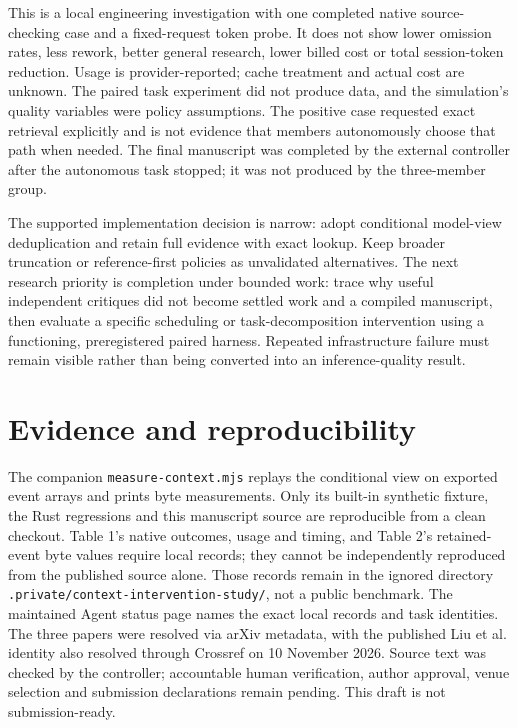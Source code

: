 \documentclass[11pt,a4paper]{article}
\begin{document}
This is a local engineering investigation with one completed native source-checking case and a fixed-request token probe. It does not show lower omission rates, less rework, better general research, lower billed cost or total session-token reduction. Usage is provider-reported; cache treatment and actual cost are unknown. The paired task experiment did not produce data, and the simulation's quality variables were policy assumptions. The positive case requested exact retrieval explicitly and is not evidence that members autonomously choose that path when needed. The final manuscript was completed by the external controller after the autonomous task stopped; it was not produced by the three-member group.

The supported implementation decision is narrow: adopt conditional model-view deduplication and retain full evidence with exact lookup. Keep broader truncation or reference-first policies as unvalidated alternatives. The next research priority is completion under bounded work: trace why useful independent critiques did not become settled work and a compiled manuscript, then evaluate a specific scheduling or task-decomposition intervention using a functioning, preregistered paired harness. Repeated infrastructure failure must remain visible rather than being converted into an inference-quality result.

\section*{Evidence and reproducibility}
The companion \texttt{measure-context.mjs} replays the conditional view on exported event arrays and prints byte measurements. Only its built-in synthetic fixture, the Rust regressions and this manuscript source are reproducible from a clean checkout. Table 1's native outcomes, usage and timing, and Table 2's retained-event byte values require local records; they cannot be independently reproduced from the published source alone. Those records remain in the ignored directory \texttt{.private/context-intervention-study/}, not a public benchmark. The maintained Agent status page names the exact local records and task identities. The three papers were resolved via arXiv metadata, with the published Liu et al. identity also resolved through Crossref on 10 November 2026. Source text was checked by the controller; accountable human verification, author approval, venue selection and submission declarations remain pending. This draft is not submission-ready.



\end{document}
